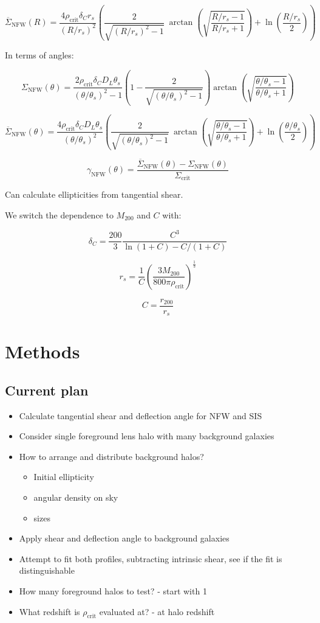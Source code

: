 \documentclass[]{article}
\begin{document}
\[\overline{\Sigma}_\mathrm{NFW}(R) = \frac{4 \rho_\mathrm{crit} \delta_C r_s}{(R/r_s)^2} \left(
    \frac{2}{\sqrt{(R/r_s)^2 - 1}} ~\arctan\left(\sqrt{\frac{R/r_s - 1}{R/r_s + 1}} \right) + \ln{\left(\frac{R/r_s}{2}\right)}
\right)\]

In terms of angles:

\[\Sigma_\mathrm{NFW}(\theta) = \frac{2 \rho_\mathrm{crit} \delta_C D_L \theta_s}{(\theta/\theta_s)^2 - 1} \left(1 - \frac{2}{\sqrt{(\theta/\theta_s)^2 - 1}} \right) \arctan\left(\sqrt{\frac{\theta/\theta_s - 1}{\theta/\theta_s + 1}} \right)\]

\[\overline{\Sigma}_\mathrm{NFW}(\theta) = \frac{4 \rho_\mathrm{crit} \delta_C D_L \theta_s}{(\theta/\theta_s)^2} \left(
    \frac{2}{\sqrt{(\theta/\theta_s)^2 - 1}} ~\arctan\left(\sqrt{\frac{\theta/\theta_s - 1}{\theta/\theta_s + 1}} \right) + \ln{\left(\frac{\theta/\theta_s}{2}\right)}
\right)\]

\[\gamma_\mathrm{NFW}(\theta) = \frac{\overline{\Sigma}_\mathrm{NFW}(\theta) - \Sigma_\mathrm{NFW}(\theta)}{\Sigma_\mathrm{crit}} \]

Can calculate ellipticities from tangential shear.

We switch the dependence to $M_{200}$ and $C$ with:

\[\delta_C = \frac{200}{3} \frac{C^3}{\ln(1 + C) - C/(1 + C)}\]

\[r_s = \frac{1}{C} \left(\frac{3M_{200}}{800\pi \rho_\mathrm{crit}}\right)^\frac{1}{3}\]

\[C = \frac{r_{200}}{r_s}\]


\section{Methods}

\subsection{Current plan}
\begin{itemize}
    \item Calculate tangential shear and deflection angle for NFW and SIS
    \item Consider single foreground lens halo with many background galaxies
    \item How to arrange and distribute background halos?
    \begin{itemize}
        \item Initial ellipticity
        \item angular density on sky
        \item sizes
    \end{itemize}
    \item Apply shear and deflection angle to background galaxies
    \item Attempt to fit both profiles, subtracting intrinsic shear, see if the fit is distinguishable
    \item How many foreground halos to test? - start with 1
    \item What redshift is $\rho_\mathrm{crit}$ evaluated at? - at halo redshift

\end{itemize}
\end{document}
